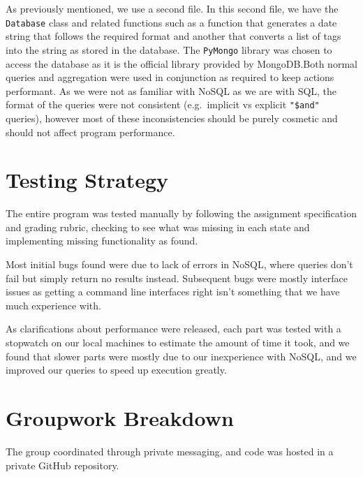 \documentclass{article}
\begin{document}
As previously mentioned, we use a second file. In this second file, we have the \verb|Database| class and related functions such as a function that generates a date string that follows the required format and another that converts a list of tags into the string as stored in the database. The \verb|PyMongo| library was chosen to access the database as it is the official library provided by MongoDB.\@ Both normal queries and aggregation were used in conjunction as required to keep actions performant. As we were not as familiar with NoSQL as we are with SQL, the format of the queries were not consistent (e.g.\ implicit vs explicit \verb|"$and"| queries), however most of these inconsistencies should be purely cosmetic and should not affect program performance.


\section{Testing Strategy}

The entire program was tested manually by following the assignment specification and grading rubric, checking to see what was missing in each state and implementing missing functionality as found.

Most initial bugs found were due to lack of errors in NoSQL, where queries don't fail but simply return no results instead. Subsequent bugs were mostly interface issues as getting a command line interfaces right isn't something that we have much experience with.

As clarifications about performance were released, each part was tested with a stopwatch on our local machines to estimate the amount of time it took, and we found that slower parts were mostly due to our inexperience with NoSQL, and we improved our queries to speed up execution greatly.

\section{Groupwork Breakdown}

The group coordinated through private messaging, and code was hosted in a private GitHub repository.
\end{document}
